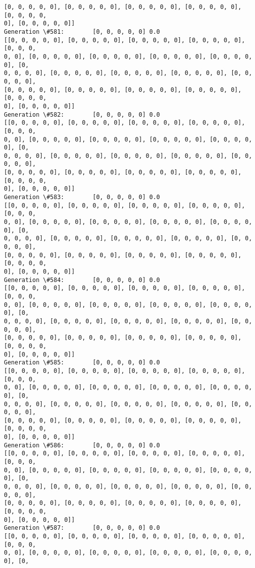 \documentclass[11pt]{article}
\begin{document}
\begin{Verbatim}[commandchars=\\\{\}]
[0, 0, 0, 0, 0], [0, 0, 0, 0, 0], [0, 0, 0, 0, 0], [0, 0, 0, 0, 0], [0, 0, 0, 0,
0], [0, 0, 0, 0, 0]]
Generation \#581:        [0, 0, 0, 0, 0] 0.0
[[0, 0, 0, 0, 0], [0, 0, 0, 0, 0], [0, 0, 0, 0, 0], [0, 0, 0, 0, 0], [0, 0, 0,
0, 0], [0, 0, 0, 0, 0], [0, 0, 0, 0, 0], [0, 0, 0, 0, 0], [0, 0, 0, 0, 0], [0,
0, 0, 0, 0], [0, 0, 0, 0, 0], [0, 0, 0, 0, 0], [0, 0, 0, 0, 0], [0, 0, 0, 0, 0],
[0, 0, 0, 0, 0], [0, 0, 0, 0, 0], [0, 0, 0, 0, 0], [0, 0, 0, 0, 0], [0, 0, 0, 0,
0], [0, 0, 0, 0, 0]]
Generation \#582:        [0, 0, 0, 0, 0] 0.0
[[0, 0, 0, 0, 0], [0, 0, 0, 0, 0], [0, 0, 0, 0, 0], [0, 0, 0, 0, 0], [0, 0, 0,
0, 0], [0, 0, 0, 0, 0], [0, 0, 0, 0, 0], [0, 0, 0, 0, 0], [0, 0, 0, 0, 0], [0,
0, 0, 0, 0], [0, 0, 0, 0, 0], [0, 0, 0, 0, 0], [0, 0, 0, 0, 0], [0, 0, 0, 0, 0],
[0, 0, 0, 0, 0], [0, 0, 0, 0, 0], [0, 0, 0, 0, 0], [0, 0, 0, 0, 0], [0, 0, 0, 0,
0], [0, 0, 0, 0, 0]]
Generation \#583:        [0, 0, 0, 0, 0] 0.0
[[0, 0, 0, 0, 0], [0, 0, 0, 0, 0], [0, 0, 0, 0, 0], [0, 0, 0, 0, 0], [0, 0, 0,
0, 0], [0, 0, 0, 0, 0], [0, 0, 0, 0, 0], [0, 0, 0, 0, 0], [0, 0, 0, 0, 0], [0,
0, 0, 0, 0], [0, 0, 0, 0, 0], [0, 0, 0, 0, 0], [0, 0, 0, 0, 0], [0, 0, 0, 0, 0],
[0, 0, 0, 0, 0], [0, 0, 0, 0, 0], [0, 0, 0, 0, 0], [0, 0, 0, 0, 0], [0, 0, 0, 0,
0], [0, 0, 0, 0, 0]]
Generation \#584:        [0, 0, 0, 0, 0] 0.0
[[0, 0, 0, 0, 0], [0, 0, 0, 0, 0], [0, 0, 0, 0, 0], [0, 0, 0, 0, 0], [0, 0, 0,
0, 0], [0, 0, 0, 0, 0], [0, 0, 0, 0, 0], [0, 0, 0, 0, 0], [0, 0, 0, 0, 0], [0,
0, 0, 0, 0], [0, 0, 0, 0, 0], [0, 0, 0, 0, 0], [0, 0, 0, 0, 0], [0, 0, 0, 0, 0],
[0, 0, 0, 0, 0], [0, 0, 0, 0, 0], [0, 0, 0, 0, 0], [0, 0, 0, 0, 0], [0, 0, 0, 0,
0], [0, 0, 0, 0, 0]]
Generation \#585:        [0, 0, 0, 0, 0] 0.0
[[0, 0, 0, 0, 0], [0, 0, 0, 0, 0], [0, 0, 0, 0, 0], [0, 0, 0, 0, 0], [0, 0, 0,
0, 0], [0, 0, 0, 0, 0], [0, 0, 0, 0, 0], [0, 0, 0, 0, 0], [0, 0, 0, 0, 0], [0,
0, 0, 0, 0], [0, 0, 0, 0, 0], [0, 0, 0, 0, 0], [0, 0, 0, 0, 0], [0, 0, 0, 0, 0],
[0, 0, 0, 0, 0], [0, 0, 0, 0, 0], [0, 0, 0, 0, 0], [0, 0, 0, 0, 0], [0, 0, 0, 0,
0], [0, 0, 0, 0, 0]]
Generation \#586:        [0, 0, 0, 0, 0] 0.0
[[0, 0, 0, 0, 0], [0, 0, 0, 0, 0], [0, 0, 0, 0, 0], [0, 0, 0, 0, 0], [0, 0, 0,
0, 0], [0, 0, 0, 0, 0], [0, 0, 0, 0, 0], [0, 0, 0, 0, 0], [0, 0, 0, 0, 0], [0,
0, 0, 0, 0], [0, 0, 0, 0, 0], [0, 0, 0, 0, 0], [0, 0, 0, 0, 0], [0, 0, 0, 0, 0],
[0, 0, 0, 0, 0], [0, 0, 0, 0, 0], [0, 0, 0, 0, 0], [0, 0, 0, 0, 0], [0, 0, 0, 0,
0], [0, 0, 0, 0, 0]]
Generation \#587:        [0, 0, 0, 0, 0] 0.0
[[0, 0, 0, 0, 0], [0, 0, 0, 0, 0], [0, 0, 0, 0, 0], [0, 0, 0, 0, 0], [0, 0, 0,
0, 0], [0, 0, 0, 0, 0], [0, 0, 0, 0, 0], [0, 0, 0, 0, 0], [0, 0, 0, 0, 0], [0,

\end{Verbatim}
\end{document}
